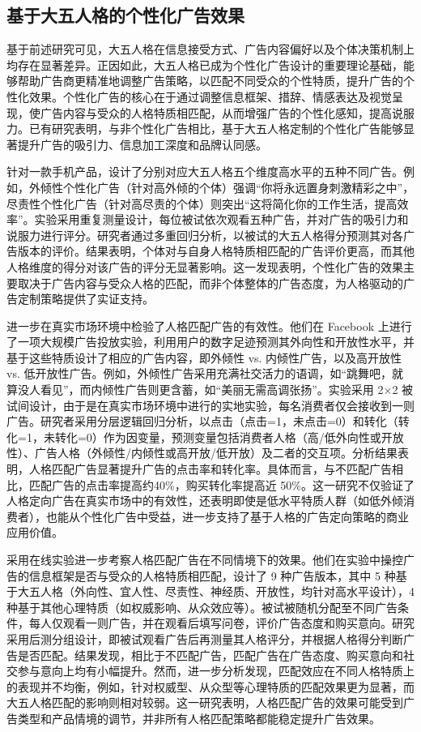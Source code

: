 \subsection{基于大五人格的个性化广告效果}

基于前述研究可见，大五人格在信息接受方式、广告内容偏好以及个体决策机制上均存在显著差异。正因如此，大五人格已成为个性化广告设计的重要理论基础，能够帮助广告商更精准地调整广告策略，以匹配不同受众的个性特质，提升广告的个性化效果。个性化广告的核心在于通过调整信息框架、措辞、情感表达及视觉呈现，使广告内容与受众的人格特质相匹配，从而增强广告的个性化感知，提高说服力。已有研究表明，与非个性化广告相比，基于大五人格定制的个性化广告能够显著提升广告的吸引力、信息加工深度和品牌认同感。

\citet{hirsh2012personalized}针对一款手机产品，设计了分别对应大五人格五个维度高水平的五种不同广告。例如，外倾性个性化广告（针对高外倾的个体）强调“你将永远置身刺激精彩之中”，尽责性个性化广告（针对高尽责的个体）则突出“这将简化你的工作生活，提高效率”。实验采用重复测量设计，每位被试依次观看五种广告，并对广告的吸引力和说服力进行评分。研究者通过多重回归分析，以被试的大五人格得分预测其对各广告版本的评价。结果表明，个体对与自身人格特质相匹配的广告评价更高，而其他人格维度的得分对该广告的评分无显著影响。这一发现表明，个性化广告的效果主要取决于广告内容与受众人格的匹配，而非个体整体的广告态度，为人格驱动的广告定制策略提供了实证支持。

\citet{matz2017psychological}进一步在真实市场环境中检验了人格匹配广告的有效性。他们在 Facebook 上进行了一项大规模广告投放实验，利用用户的数字足迹预测其外向性和开放性水平，并基于这些特质设计了相应的广告内容，即外倾性 vs. 内倾性广告，以及高开放性 vs. 低开放性广告。例如，外倾性广告采用充满社交活力的语调，如“跳舞吧，就算没人看见”，而内倾性广告则更含蓄，如“美丽无需高调张扬”。实验采用 2×2 被试间设计，由于是在真实市场环境中进行的实地实验，每名消费者仅会接收到一则广告。研究者采用分层逻辑回归分析，以点击（点击=1，未点击=0）和转化（转化=1，未转化=0）作为因变量，预测变量包括消费者人格（高/低外向性或开放性）、广告人格（外倾性/内倾性或高开放/低开放）及二者的交互项。分析结果表明，人格匹配广告显著提升广告的点击率和转化率。具体而言，与不匹配广告相比，匹配广告的点击率提高约40\%，购买转化率提高近 50\%。这一研究不仅验证了人格定向广告在真实市场中的有效性，还表明即使是低水平特质人群（如低外倾消费者），也能从个性化广告中受益，进一步支持了基于人格的广告定向策略的商业应用价值。

\citet{winter2021effects}采用在线实验进一步考察人格匹配广告在不同情境下的效果。他们在实验中操控广告的信息框架是否与受众的人格特质相匹配，设计了 9 种广告版本，其中 5 种基于大五人格（外向性、宜人性、尽责性、神经质、开放性，均针对高水平设计），4 种基于其他心理特质（如权威影响、从众效应等）。被试被随机分配至不同广告条件，每人仅观看一则广告，并在观看后填写问卷，评价广告态度和购买意向。研究采用后测分组设计，即被试观看广告后再测量其人格评分，并根据人格得分判断广告是否匹配。结果发现，相比于不匹配广告，匹配广告在广告态度、购买意向和社交参与意向上均有小幅提升。然而，进一步分析发现，匹配效应在不同人格特质上的表现并不均衡，例如，针对权威型、从众型等心理特质的匹配效果更为显著，而大五人格匹配的影响则相对较弱。这一研究表明，人格匹配广告的效果可能受到广告类型和产品情境的调节，并非所有人格匹配策略都能稳定提升广告效果。

